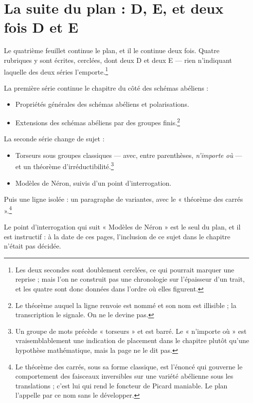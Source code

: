 \documentclass[11pt,a4paper]{article}
\begin{document}
\section*{La suite du plan : D, E, et deux fois D et E}

Le quatrième feuillet continue le plan, et il le continue deux fois. Quatre
rubriques y sont écrites, cerclées, dont deux D et deux E --- rien n'indiquant
laquelle des deux séries l'emporte.\footnote{Les deux secondes sont
doublement cerclées, ce qui pourrait marquer une reprise ; mais l'on ne
construit pas une chronologie sur l'épaisseur d'un trait, et les quatre sont
donc données dans l'ordre où elles figurent.}

La première série continue le chapitre du côté des schémas abéliens :

\begin{itemize}
\item[(D)] Propriétés générales des schémas abéliens et polarisations.
\item[(E)] Extensions des schémas abéliens par des groupes finis.\footnote{Le
théorème auquel la ligne renvoie est nommé et son nom est illisible ; la
transcription le signale. On ne le devine pas.}
\end{itemize}

La seconde série change de sujet :

\begin{itemize}
\item[(D)] Torseurs sous groupes classiques --- avec, entre parenthèses,
\emph{n'importe où} --- et un théorème d'irréductibilité.\footnote{Un groupe de
mots précède « torseurs » et est barré. Le « n'importe où » est vraisemblablement
une indication de placement dans le chapitre plutôt qu'une hypothèse
mathématique, mais la page ne le dit pas.}
\item[(E)] Modèles de Néron, suivis d'un point d'interrogation.
\end{itemize}

Puis une ligne isolée : un paragraphe de variantes, avec le « théorème des
carrés ».\footnote{Le théorème des carrés, sous sa forme classique, est
l'énoncé qui gouverne le comportement des faisceaux inversibles sur une variété
abélienne sous les translations ; c'est lui qui rend le foncteur de Picard
maniable. Le plan l'appelle par ce nom sans le développer.}

Le point d'interrogation qui suit « Modèles de Néron » est le seul du plan, et
il est instructif : à la date de ces pages, l'inclusion de ce sujet dans le
chapitre n'était pas décidée.
\end{document}
